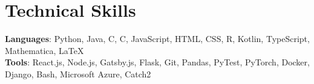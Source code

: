 \documentclass[letterpaper,11pt]{article}
\newcommand{\CC}{C\nolinebreak\hspace{-.05em}\raisebox{.4ex}{\tiny\bf +}\nolinebreak\hspace{-.10em}\raisebox{.4ex}{\tiny\bf +}}
\def\CC{{C\nolinebreak[4]\hspace{-.05em}\raisebox{.4ex}{\tiny\bf ++}}}
\begin{document}
\section{Technical Skills}
 \begin{itemize}[leftmargin=0.15in, label={}]
    \small{\item{
     \textbf{Languages}{: Python, Java, C, \CC, JavaScript, HTML, CSS, R, Kotlin, TypeScript, Mathematica, \LaTeX}\\
     \textbf{Tools}{: React.js, Node.js, Gatsby.js, Flask, Git, Pandas, PyTest, PyTorch, Docker, Django, Bash, Microsoft Azure, Catch2} \\
    }}
 \end{itemize}
\end{document}
